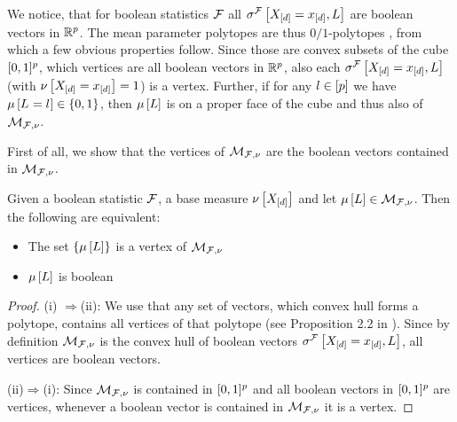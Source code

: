 We notice, that for boolean statistics $\mathcal{F}$ all $\sigma^{\mathcal{F}}\left[X_{[d]}=x_{[d]},L\right]$ are boolean vectors in $\mathbb{R}^{p}$.
The mean parameter polytopes are thus $0/1$-polytopes \cite{ziegler_lectures_2000,gillmann_01-polytopes_2007}, from which a few obvious properties follow.
Since those are convex subsets of the cube $[0,1]^p$, which vertices are all boolean vectors in $\mathbb{R}^{p}$, also each $\sigma^{\mathcal{F}}\left[X_{[d]}=x_{[d]},L\right]$ (with $\nu\left[X_{[d]}=x_{[d]}\right]=1$) is a vertex.
Further, if for any $l\in[p]$ we have $\mu\left[L_{}=l_{}\right]\in\{0,1\}$, then $\mu\left[L\right]$ is on a proper face of the cube and thus also of $\mathcal{M}_{\mathcal{F},\nu}$.


First of all, we show that the vertices of $\mathcal{M}_{\mathcal{F},\nu}$ are the boolean vectors contained in $\mathcal{M}_{\mathcal{F},\nu}$.

\begin{theorem}
    \label{the:vertexByHardLogicNetworks}
    Given a boolean statistic $\mathcal{F}$, a base measure $\nu\left[X_{[d]}\right]$ and let $\mu\left[L\right]\in\mathcal{M}_{\mathcal{F},\nu}$.
    Then the following are equivalent:
    \begin{itemize}
        \item[(i)] The set $\{\mu\left[L\right]\}$ is a vertex of $\mathcal{M}_{\mathcal{F},\nu}$
        \item[(ii)] $\mu\left[L\right]$ is boolean
    \end{itemize}
\end{theorem}
\begin{proof}
(i)
    $\Rightarrow$(ii):
    We use that any set of vectors, which convex hull forms a polytope, contains all vertices of that polytope (see Proposition 2.2 in \cite{ziegler_lectures_2013}).
    Since by definition $\mathcal{M}_{\mathcal{F},\nu}$ is the convex hull of boolean vectors $\sigma^{\mathcal{F}}\left[X_{[d]}=x_{[d]},L\right]$, all vertices are boolean vectors.

    (ii)$\Rightarrow$(i):
    Since $\mathcal{M}_{\mathcal{F},\nu}$ is contained in $[0,1]^{p}$ and all boolean vectors in $[0,1]^{p}$ are vertices, whenever a boolean vector is contained in $\mathcal{M}_{\mathcal{F},\nu}$ it is a vertex.
\end{proof}

